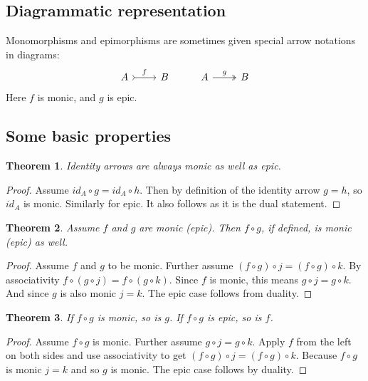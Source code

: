 \documentclass[12pt, a4paper]{article}
\newtheorem{theorem}{Theorem}[section]
\numberwithin{equation}{section}
\begin{document}
\subsection{Diagrammatic representation}
Monomorphisms and epimorphisms are sometimes given special arrow notations in diagrams: 
\begin{equation*}
\begin{tikzcd}
A\arrow[r, "f", rightarrowtail] & B &
A\arrow[r, "g", twoheadrightarrow] & B
\end{tikzcd}
\end{equation*}
Here $f$ is monic, and $g$ is epic.

\subsection{Some basic properties}
\begin{theorem}
Identity arrows are always monic as well as epic.
\end{theorem}
\begin{proof}
Assume $id_A\circ g=id_A\circ h$. Then by definition of the identity arrow $g=h$, so $id_A$ is monic. Similarly for epic. It also follows as it is the dual statement.
\end{proof}

\begin{theorem}
Assume $f$ and $g$ are monic (epic). Then $f\circ g$, if defined, is monic (epic) as well. 
\end{theorem}
\begin{proof}
Assume $f$ and $g$ to be monic. Further assume $(f\circ g)\circ j=(f\circ g)\circ k$. By associativity $f\circ(g\circ j)=f\circ(g\circ k)$. Since $f$ is monic, this means $g\circ j=g\circ k$. And since $g$ is also monic $j=k$. The epic case follows from duality.
\end{proof}

\begin{theorem}
If $f\circ g$ is monic, so is $g$. If $f\circ g$ is epic, so is $f$.
\end{theorem}
\begin{proof}
Assume $f\circ g$ is monic. Further assume $g\circ j=g\circ k$. Apply $f$ from the left on both sides and use associativity to get $(f\circ g)\circ j=(f\circ g)\circ k$. Because $f\circ g$ is monic $j=k$ and so $g$ is monic. The epic case follows by duality.
\end{proof}
\end{document}
